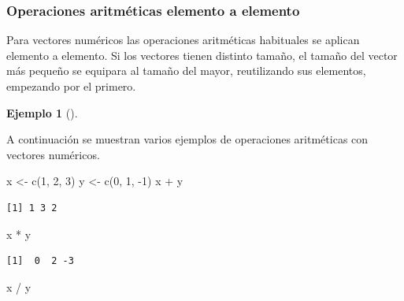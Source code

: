 \documentclass[
  a4paper,
]{scrreport}
\newenvironment{Shaded}{\begin{snugshade}}{\end{snugshade}}
\newcommand{\DecValTok}[1]{\textcolor[rgb]{0.68,0.00,0.00}{#1}}
\newcommand{\FunctionTok}[1]{\textcolor[rgb]{0.28,0.35,0.67}{#1}}
\newcommand{\NormalTok}[1]{\textcolor[rgb]{0.00,0.23,0.31}{#1}}
\newcommand{\OtherTok}[1]{\textcolor[rgb]{0.00,0.23,0.31}{#1}}
\newcommand{\SpecialCharTok}[1]{\textcolor[rgb]{0.37,0.37,0.37}{#1}}
\theoremstyle{definition}
\theoremstyle{definition}
\newtheorem{example}{Ejemplo}[chapter]
\theoremstyle{remark}
\begin{document}
\hypertarget{operaciones-aritmuxe9ticas-elemento-a-elemento}{%
\subsubsection{Operaciones aritméticas elemento a
elemento}\label{operaciones-aritmuxe9ticas-elemento-a-elemento}}

Para vectores numéricos las operaciones aritméticas habituales se
aplican elemento a elemento. Si los vectores tienen distinto tamaño, el
tamaño del vector más pequeño se equipara al tamaño del mayor,
reutilizando sus elementos, empezando por el primero.

\leavevmode{}%
\begin{example}[]\label{exm-operaciones-aritmeticas-vectores}

A continuación se muestran varios ejemplos de operaciones aritméticas
con vectores numéricos.

\begin{Shaded}
\begin{Highlighting}[]
\NormalTok{x }\OtherTok{\textless{}{-}} \FunctionTok{c}\NormalTok{(}\DecValTok{1}\NormalTok{, }\DecValTok{2}\NormalTok{, }\DecValTok{3}\NormalTok{)}
\NormalTok{y }\OtherTok{\textless{}{-}} \FunctionTok{c}\NormalTok{(}\DecValTok{0}\NormalTok{, }\DecValTok{1}\NormalTok{, }\SpecialCharTok{{-}}\DecValTok{1}\NormalTok{)}
\NormalTok{x }\SpecialCharTok{+}\NormalTok{ y}
\end{Highlighting}
\end{Shaded}

\begin{verbatim}
[1] 1 3 2
\end{verbatim}

\begin{Shaded}
\begin{Highlighting}[]
\NormalTok{x }\SpecialCharTok{*}\NormalTok{ y}
\end{Highlighting}
\end{Shaded}

\begin{verbatim}
[1]  0  2 -3
\end{verbatim}

\begin{Shaded}
\begin{Highlighting}[]
\NormalTok{x }\SpecialCharTok{/}\NormalTok{ y}
\end{Highlighting}
\end{Shaded}


\end{example}
\end{document}
